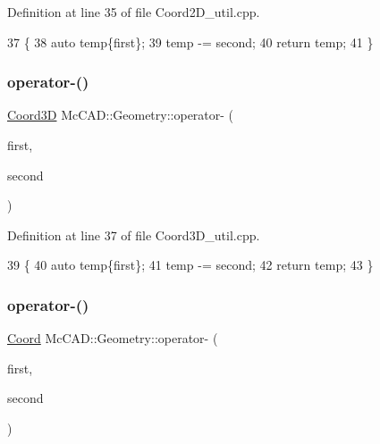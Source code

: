 Definition at line 35 of file Coord2\+D\+\_\+util.\+cpp.


\begin{DoxyCode}
37                               \{
38     \textcolor{keyword}{auto} temp\{first\};
39     temp -= second;
40     \textcolor{keywordflow}{return} temp;
41 \}
\end{DoxyCode}
\mbox{\label{namespaceMcCAD_1_1Geometry_accc8c068bb6e7d639ab12dd0c1c4e3b9}} 
\subsubsection{\texorpdfstring{operator-\/()}{operator-()}\hspace{0.1cm}{\footnotesize\ttfamily [5/6]}}
{\footnotesize\ttfamily \hyperlink{classMcCAD_1_1Geometry_1_1Coord3D}{Coord3D} Mc\+C\+A\+D\+::\+Geometry\+::operator-\/ (\begin{DoxyParamCaption}\item[{const \hyperlink{classMcCAD_1_1Geometry_1_1Coord3D}{Coord3D} \&}]{first,  }\item[{const \hyperlink{classMcCAD_1_1Geometry_1_1Coord3D}{Coord3D} \&}]{second }\end{DoxyParamCaption})}



Definition at line 37 of file Coord3\+D\+\_\+util.\+cpp.


\begin{DoxyCode}
39                               \{
40     \textcolor{keyword}{auto} temp\{first\};
41     temp -= second;
42     \textcolor{keywordflow}{return} temp;
43 \}
\end{DoxyCode}
\mbox{\label{namespaceMcCAD_1_1Geometry_a805fb54442634608e273357df94bd246}} 
\subsubsection{\texorpdfstring{operator-\/()}{operator-()}\hspace{0.1cm}{\footnotesize\ttfamily [6/6]}}
{\footnotesize\ttfamily \hyperlink{classMcCAD_1_1Geometry_1_1Coord}{Coord} Mc\+C\+A\+D\+::\+Geometry\+::operator-\/ (\begin{DoxyParamCaption}\item[{const \hyperlink{classMcCAD_1_1Geometry_1_1Coord}{Coord} \&}]{first,  }\item[{const \hyperlink{classMcCAD_1_1Geometry_1_1Coord}{Coord} \&}]{second }\end{DoxyParamCaption})}



